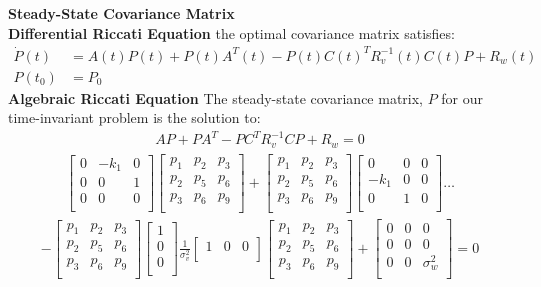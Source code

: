 \documentclass[paper=a4, fontsize=11pt]{scrartcl}
\numberwithin{equation}{section}		%
\numberwithin{figure}{section}			%
\numberwithin{table}{section}				%
\begin{document}
\textbf{Steady-State Covariance Matrix}\\

\textbf{Differential Riccati Equation}
the optimal covariance matrix satisfies:
\begin{align*}
\dot{P}(t)&=A(t)P(t)+P(t)A^T(t)-P(t)C(t)^TR^{-1}_{v}(t)C(t)P+R_w(t)\\
P(t_0)&=P_0
\end{align*}
\textbf{Algebraic Riccati Equation}
The steady-state covariance matrix, $P$ for our time-invariant problem is the solution to:
\begin{align*}
AP+PA^T-PC^TR^{-1}_{v}CP+R_w=0
\end{align*}
\begin{align*}
\begin{bmatrix}
0& -k_1 &0\\
0 &0& 1\\
0 &0& 0\\
\end{bmatrix}
\begin{bmatrix}
p_1 & p_2 & p_3\\
p_2 & p_5 & p_6\\
p_3 & p_6 & p_9 \\
\end{bmatrix}+
\begin{bmatrix}
p_1 & p_2 & p_3\\
p_2 & p_5 & p_6\\
p_3 & p_6 & p_9 \\
\end{bmatrix}
\begin{bmatrix}
0 & 0 & 0\\
-k_1 & 0 & 0\\
0 & 1 & 0 \\
\end{bmatrix} \dots
\end{align*}
\begin{align*}
-
\begin{bmatrix}
p_1 & p_2 & p_3\\
p_2 & p_5 & p_6\\
p_3 & p_6 & p_9 \\
\end{bmatrix}
\begin{bmatrix}
1\\
0\\
0\\
\end{bmatrix}\frac{1}{\sigma_v^2}
\begin{bmatrix}
1&0&0\\
\end{bmatrix}
\begin{bmatrix}
p_1 & p_2 & p_3\\
p_2 & p_5 & p_6\\
p_3 & p_6 & p_9 \\
\end{bmatrix}
+
\begin{bmatrix}
0 & 0 & 0\\
0 & 0 & 0\\
0 & 0 & \sigma_w^2 \\
\end{bmatrix}=0
\end{align*}
\end{document}
